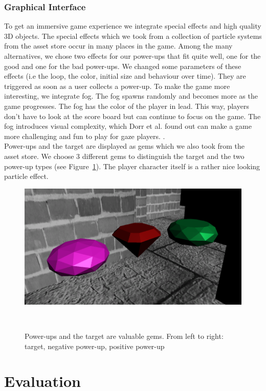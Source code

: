 \documentclass{sigchi}
\begin{document}
\subsubsection{Graphical Interface} 
To get an immersive game experience we integrate special effects and high quality 3D objects. The special effects which we took from a collection of particle systems from the asset store occur in many places in the game. Among the many alternatives, we chose two effects for our power-ups that fit quite well, one for the good and one for the bad power-ups. We changed some parameters of these effects (i.e the loop, the color, initial size and behaviour over time). They are triggered as soon as a user collects a power-up. To make the game more interesting, we integrate fog. The fog spawns randomly and becomes more as the game progresses. The fog has the color of the player in lead. This way, players don't have to look at the score board but can continue to focus on the game. The fog introduces visual complexity, which Dorr et al. found out can make a game more challenging and fun to play for gaze players. \cite{dorr2009gaze} .\\
Power-ups and the target are displayed as gems which we also took from the asset store. We choose 3 different gems to distinguish the target and the two power-up types  (see Figure~\ref{fig:figure4}). The player character itself is a rather nice looking particle effect.
\begin{figure}
\centering
  \includegraphics[width=0.9\columnwidth]{figures/gems}
  \caption{Power-ups and the target are valuable gems. From left to right: target, negative power-up, positive power-up}~\label{fig:figure4}
\end{figure}

\section{Evaluation}
\end{document}
